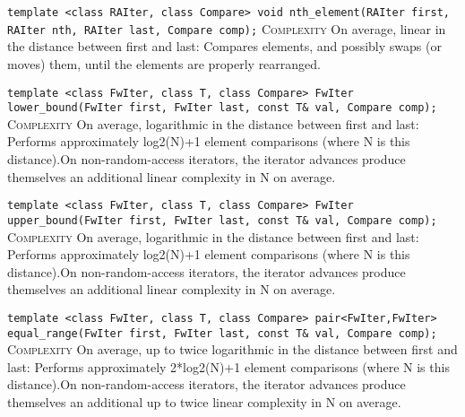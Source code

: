 \noindent{}\hspace*{0.25em}\lstinline[basicstyle=\ttfamily\color{corange}]{template <class RAIter, class Compare> void nth_element(RAIter first, RAIter nth, RAIter last, Compare comp);} \textsc{Complexity} On average, linear in the distance between first and last: Compares elements, and possibly swaps (or moves) them, until the elements are properly rearranged.\\\vspace{-0.6em}

\noindent{}\hspace*{0.25em}\lstinline[basicstyle=\ttfamily\color{corange}]{template <class FwIter, class T, class Compare> FwIter lower_bound(FwIter first, FwIter last, const T& val, Compare comp);} \textsc{Complexity} On average, logarithmic in the distance between first and last: Performs approximately log2(N)+1 element comparisons (where N is this distance).On non-random-access iterators, the iterator advances produce themselves an additional linear complexity in N on average.\\\vspace{-0.6em}

\noindent{}\hspace*{0.25em}\lstinline[basicstyle=\ttfamily\color{corange}]{template <class FwIter, class T, class Compare> FwIter upper_bound(FwIter first, FwIter last, const T& val, Compare comp);} \textsc{Complexity} On average, logarithmic in the distance between first and last: Performs approximately log2(N)+1 element comparisons (where N is this distance).On non-random-access iterators, the iterator advances produce themselves an additional linear complexity in N on average.\\\vspace{-0.6em}

\noindent{}\hspace*{0.25em}\lstinline[basicstyle=\ttfamily\color{corange}]{template <class FwIter, class T, class Compare> pair<FwIter,FwIter> equal_range(FwIter first, FwIter last, const T& val, Compare comp);} \textsc{Complexity} On average, up to twice logarithmic in the distance between first and last: Performs approximately 2*log2(N)+1 element comparisons (where N is this distance).On non-random-access iterators, the iterator advances produce themselves an additional up to twice linear complexity in N on average.\\\vspace{-0.6em}

